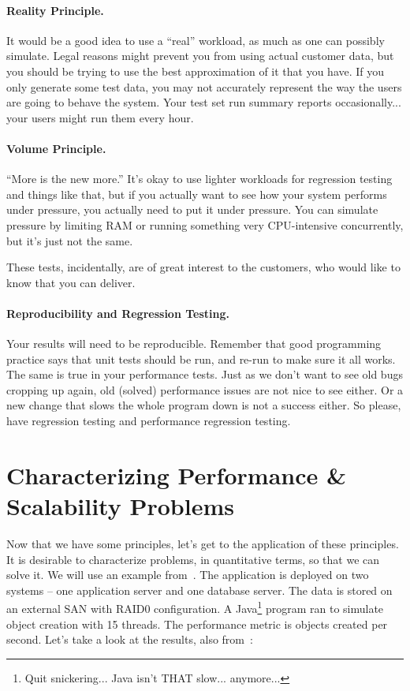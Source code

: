 \documentclass[a4paper]{report}
\begin{document}
\paragraph{Reality Principle.}
It would be a good idea to use a ``real'' workload, as much as one can possibly simulate. Legal reasons might prevent you from using actual customer data, but you should be trying to use the best approximation of it that you have. If you only generate some test data, you may not accurately represent the way the users are going to behave the system. Your test set run summary reports occasionally... your users might run them every hour. 

\paragraph{Volume Principle.}
``More is the new more.'' It's okay to use lighter workloads for regression testing and things like that, but if you actually want to see how your system performs under pressure, you actually need to put it under pressure. You can simulate pressure by limiting RAM or running something very CPU-intensive concurrently, but it's just not the same.

These tests, incidentally, are of great interest to the customers, who would like to know that you can deliver. 

\paragraph{Reproducibility and Regression Testing.}
Your results will need to be reproducible. Remember that good programming practice says that unit tests should be run, and re-run to make sure it all works. The same is true in your performance tests. Just as we don't want to see old bugs cropping up again, old (solved) performance issues are not nice to see either. Or a new change that slows the whole program down is not a success either. So please, have regression testing and performance regression testing.

\section*{Characterizing Performance \& Scalability Problems}

Now that we have some principles, let's get to the application of these principles. It is desirable to characterize problems, in quantitative terms, so that we can solve it. We will use an example from~\cite{swps}. The application is deployed on two systems -- one application server and one database server. The data is stored on an external SAN with RAID0 configuration. A Java\footnote{Quit snickering... Java isn't THAT slow... anymore...} program ran to simulate object creation with 15 threads. The performance metric is objects created per second. Let's take a look at the results, also from~\cite{swps}:
\end{document}
